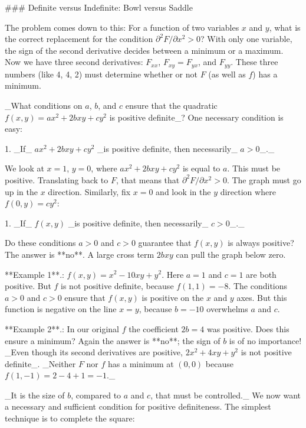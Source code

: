 

### Definite versus Indefinite: Bowl versus Saddle

The problem comes down to this: For a function of two variables \(x\) and \(y\), what is the correct replacement for the condition \(\partial^{2}F/\partial x^{2}>0\)? With only one variable, the sign of the second derivative decides between a minimum or a maximum. Now we have three second derivatives: \(F_{xx}\), \(F_{xy}=F_{yx}\), and \(F_{yy}\). These three numbers (like 4, 4, 2) must determine whether or not \(F\) (as well as \(f\)) has a minimum.

_What conditions on \(a\), \(b\), and \(c\) ensure that the quadratic \(f(x,y)=ax^{2}+2bxy+cy^{2}\) is positive definite_? One necessary condition is easy:

1. _If_ \(ax^{2}+2bxy+cy^{2}\) _is positive definite, then necessarily_ \(a>0\)_._

We look at \(x=1\), \(y=0\), where \(ax^{2}+2bxy+cy^{2}\) is equal to \(a\). This must be positive. Translating back to \(F\), that means that \(\partial^{2}F/\partial x^{2}>0\). The graph must go up in the \(x\) direction. Similarly, fix \(x=0\) and look in the \(y\) direction where \(f(0,y)=cy^{2}\):

1. _If_ \(f(x,y)\) _is positive definite, then necessarily_ \(c>0\)_._

Do these conditions \(a>0\) and \(c>0\) guarantee that \(f(x,y)\) is always positive? The answer is **no**. A large cross term \(2bxy\) can pull the graph below zero.

**Example 1**.: \(f(x,y)=x^{2}-10xy+y^{2}\). Here \(a=1\) and \(c=1\) are both positive. But \(f\) is not positive definite, because \(f(1,1)=-8\). The conditions \(a>0\) and \(c>0\) ensure that \(f(x,y)\) is positive on the \(x\) and \(y\) axes. But this function is negative on the line \(x=y\), because \(b=-10\) overwhelms \(a\) and \(c\).

**Example 2**.: In our original \(f\) the coefficient \(2b=4\) was positive. Does this ensure a minimum? Again the answer is **no**; the sign of \(b\) is of no importance! _Even though its second derivatives are positive, \(2x^{2}+4xy+y^{2}\) is not positive definite_. _Neither \(F\) nor \(f\) has a minimum at \((0,0)\) because \(f(1,-1)=2-4+1=-1\)._

_It is the size of \(b\), compared to \(a\) and \(c\), that must be controlled._ We now want a necessary and sufficient condition for positive definiteness. The simplest technique is to complete the square:

